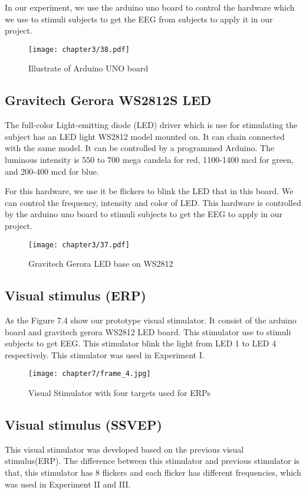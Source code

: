 In our experiment, we use the arduino uno board to control the hardware which we use to stimuli subjects to get the EEG from subjects to apply it in our project.
\begin{figure}[ht]
	\centering
	\texttt{[image: chapter3/38.pdf]}
	\caption{Illustrate of Arduino UNO board}
\end{figure}

\subsection{Gravitech Gerora WS2812S LED}
\hspace{1.5cm} The full-color Light-emitting diode (LED) driver which is use for stimulating the subject has an LED light WS2812 model mounted on. It can chain connected with the same model. It can be controlled by a programmed Arduino. The luminous intensity is 550 to 700 mega candela for red, 1100-1400 mcd for green, and 200-400 mcd for blue.

For this hardware, we use it be flickers to blink the LED that in this board. We can control the frequency, intensity and color of LED. This hardware is controlled by the arduino uno board to stimuli subjects to get the EEG to apply in our project.
\begin{figure}[ht]
	\centering
	\texttt{[image: chapter3/37.pdf]}
	\caption{Gravitech Gerora LED base on WS2812}
\end{figure}

\subsection{Visual stimulus (ERP)}
\hspace{1.5cm} As the Figure 7.4 show our prototype visual stimulator. It consist of the arduino board and gravitech gerora WS2812 LED board. This stimulator use to stimuli subjects to get EEG. This stimulator blink the light from LED 1 to LED 4 respectively. This stimulator was used in Experiment I.

\begin{figure}[ht]
	\centering
	\texttt{[image: chapter7/frame\_4.jpg]}
	\caption{Visual Stimulator with four targets used for ERPs}
\end{figure}

\newpage
\subsection{Visual stimulus (SSVEP)}
\hspace{1.5cm} This visual stimulator was developed based on the previous visual stimulus(ERP). The difference between this stimulator and previous stimulator is that, this stimulator has 8 flickers and each flicker has different frequencies, which was used in Experiment II and III.

